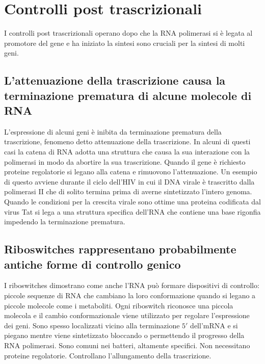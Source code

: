 \section{Controlli post trascrizionali}
I controlli post trascrizionali operano dopo che la RNA polimerasi si \`e legata al promotore del gene e ha iniziato la sintesi sono cruciali per la sintesi di molti geni. 
\subsection{L'attenuazione della trascrizione causa la terminazione prematura di alcune molecole di RNA}
L'espressione di alcuni geni \`e inibita da terminazione prematura della trascrizione, fenomeno detto attenuazione della trascrizione. In alcuni di questi casi la catena di RNA adotta 
una struttura che causa la sua interazione con la polimerasi in modo da abortire la sua trascrizione. Quando il gene \`e richiesto proteine regolatorie si legano alla catena e rimuovono
l'attenuazione. Un esempio di questo avviene durante il ciclo dell'HIV in cui il DNA virale \`e trascritto dalla polimerasi II che di solito termina prima di averne sintetizzato l'intero
genoma. Quando le condizioni per la crescita virale sono ottime una proteina codificata dal virus Tat si lega a una struttura specifica dell'RNA che contiene una base rigonfia impedendo
la terminazione prematura. 
\subsection{Riboswitches rappresentano probabilmente antiche forme di controllo genico}
I riboswitches dimostrano come anche l'RNA pu\`o formare dispositivi di controllo: piccole sequenze di RNA che cambiano la loro conformazione quando si legano a piccole molecole come i 
metaboliti. Ogni riboswitch riconosce una piccola molecola e il cambio conformazionale viene utilizzato per regolare l'espressione dei geni. Sono spesso localizzati vicino alla 
terminazione $5'$ dell'mRNA e si piegano mentre viene sintetizzato bloccando o permettendo il progresso della RNA polimerasi. Sono comuni nei batteri, altamente specifici. Non 
necessitano proteine regolatorie. Controllano l'allungamento della trascrizione.
